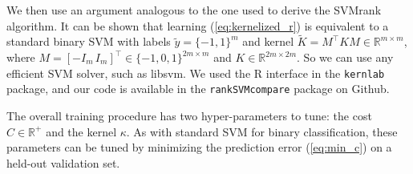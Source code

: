 \documentclass{article}
\newcommand{\RR}{\mathbb R}
\DeclareMathOperator*{\minimize}{minimize}
\begin{document}
We then use an argument analogous to the one \citet{ranksvm} used to
derive the SVMrank algorithm. It can be shown that learning
(\ref{eq:kernelized_r}) is equivalent to a standard binary SVM with
labels $\tilde y=\{-1,1\}^m$ and kernel $\tilde K = M^\intercal K
M\in\RR^{m\times m}$, where $M=[-I_m \,
I_m]^\intercal\in\{-1,0,1\}^{2m\times m}$ and $K\in\RR^{2m\times 2m}$.
So we can use any efficient SVM solver, such as libsvm. We used the R
interface in the \texttt{kernlab} package, and our code is available
in the \texttt{rankSVMcompare} package on Github.

The overall training procedure has two hyper-parameters to tune: the
cost $C\in\RR^+$ and the kernel $\kappa$. As with standard SVM for
binary classification, these parameters can be tuned by minimizing the
prediction error (\ref{eq:min_c}) on a held-out validation set.



\end{document}
